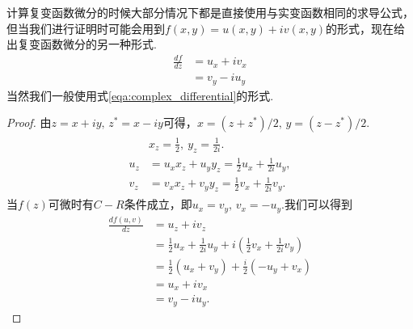         \begin{proposition}\label{pro:complex_function_differential}
            计算复变函数微分的时候大部分情况下都是直接使用与实变函数相同的求导公式，但当我们进行证明时可能会用到$f(x,y)=u(x,y)+iv(x,y)$的形式，现在给出复变函数微分的另一种形式.
            \begin{align}
                \frac{d f}{d z} &= u_x + iv_x \label{eqa:complex_differential}\\
                &= v_y - iu_y
            \end{align}
            当然我们一般使用式\ref{eqa:complex_differential}的形式.
        \end{proposition}
        \begin{proof}
            由$z=x+iy,\,z^*=x-iy$可得，$x=(z+z^*)/2,\,y=(z-z^*)/2$.
            \begin{align}
                \begin{split}
                &x_z=\frac12,\ y_z=\frac1{2i}.\\
                u_z&=u_x x_z + u_y y_z = \frac12 u_x + \frac1{2i} u_y,\\
                v_z&=v_x x_z + v_y y_z = \frac12 v_x + \frac1{2i} v_y.
                \end{split}
            \end{align}
            当$f(z)$可微时有$C-R$条件成立，即$u_x=v_y,\,v_x=-u_y$.我们可以得到
            \begin{align*}
                \frac{df(u,v)}{dz}&=u_z+iv_z\\
                &=\frac12 u_x + \frac1{2i} u_y+i\left(\frac12 v_x + \frac1{2i} v_y\right)\\
                &=\frac12 (u_x + v_y) + \frac i2 (- u_y + v_x)\\
                &=u_x + iv_x\\
                &=v_y - iu_y.
            \end{align*}
        \end{proof}

